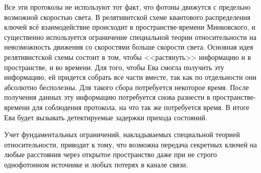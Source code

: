 Все эти протоколы не используют тот факт, что фотоны движутся с предельно возможной скоростью света. 
В релятивитской схеме квантового распределения ключей всё взаимодействие происходит в пространстве-времени Минковского, и существенно используется ограничение специальной теории относительности на невозможность движения со скоростями больше скорости света. Основная идея релятивистской схемы состоит в том, чтобы <<растянуть>> информацию и в пространстве, и во времени. Для того, чтобы Ева смогла получить эту информацию, ей придется собрать все части вместе, так как по отдельности они абсолютно бесполезны. Для такого сбора потребуется некоторое время. После получения данных эту информацию потребуется снова разнести в пространстве-времени для соблюдения протокола, на что так же потребуется время. В итоге Ева будет вызывать детектируемые задержки прихода состояний.

Учет фундаментальных ограничений, накладываемых специальной теорией относительности, приводит к тому, что возможна передача секретных ключей на любые расстояния через открытое пространство даже при не строго однофотонном источнике и любых потерях в канале связи.